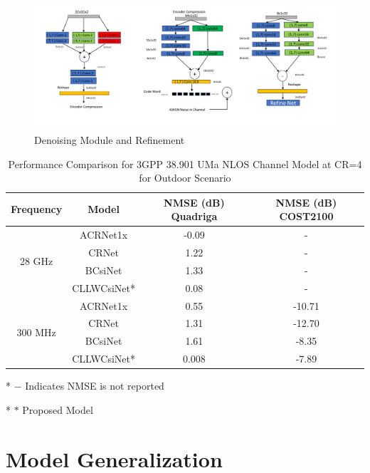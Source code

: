 \documentclass[lettersize,journal]{IEEEtran}
\begin{document}
\begin{figure}[ht]
	\centering
	\includegraphics[width=0.8\linewidth]{Model_c.pdf}
	\caption{Denoising Module and Refinement}
	\label{fig:figure3}
\end{figure}



	
	\begin{table}[ht]
		\centering
		\caption{Performance Comparison for 3GPP 38.901 UMa NLOS Channel Model at CR=4 for Outdoor Scenario}
		\label{table:performance_comparison}
		\begin{threeparttable}
			\begin{tabular}{cccc}
				\toprule
				\textbf{Frequency} & \textbf{Model} & \textbf{NMSE (dB) Quadriga} & \textbf{NMSE (dB) COST2100} \\
				\midrule
				\multirow{4}{*}{28 GHz} & ACRNet1x\cite{abx} & -0.09 & - \\
				& CRNet\cite{abn} & 1.22 & - \\
				& BCsiNet\cite{abp} & 1.33 & - \\
				& CLLWCsiNet* & 0.08 & - \\
				\midrule
				\multirow{4}{*}{300 MHz} & ACRNet1x\cite{abx} & 0.55 & -10.71 \\
				& CRNet\cite{abn} & 1.31 & -12.70 \\
				& BCsiNet\cite{abp} & 1.61 & -8.35 \\
				& CLLWCsiNet* & 0.008 & -7.89 \\
				\bottomrule
			\end{tabular}
			\begin{tablenotes}
				\item[*] $ -$ Indicates NMSE is not reported
				\item[*] $ *$ Proposed Model
			\end{tablenotes}
		\end{threeparttable}
	\end{table}
	




\section{Model Generalization}
\end{document}
